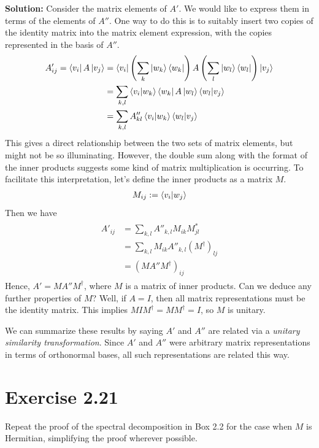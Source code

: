 \documentclass{book}
\begin{document}
    \textbf{Solution:} Consider the matrix elements of $A'$. We would like to express them in terms of the elements of $A''$. One way to do this is to suitably insert two copies of the identity matrix into the matrix element expression, with the copies represented in the basis of $A''$. 
    \begin{align}
    \begin{aligned}
        A'_{ij} = \bra{v_i}A\ket{v_j} &= \bra{v_i}\left(\sum_k \ket{w_k}\bra{w_k}\right) A \left(\sum_l \ket{w_l}\bra{w_l}\right)\ket{v_j} \\
        &= \sum_{k,l} \bra{v_i}\ket{w_k}\bra{w_k}A\ket{w_l}\bra{w_l}\ket{v_j} \\
        &= \sum_{k,l}A''_{kl} \braket{v_i}{w_k}\braket{w_l}{v_j}
    \end{aligned}
    \end{align}
    This gives a direct relationship between the two sets of matrix elements, but might not be so illuminating. However, the double sum along with the format of the inner products suggests some kind of matrix multiplication is occurring. To facilitate this interpretation, let's define the inner products as a matrix $M$.
    \begin{align}
        M_{ij} := \bra{v_i}\ket{w_j}
    \end{align}
    Then we have
    \begin{align}
    \begin{aligned}
        A'_{ij} &= \sum_{k,l} A''_{k,l} M_{ik} M_{jl}^* \\
        &= \sum_{k,l} M_{ik} A''_{k,l} (M^\dagger)_{lj} \\
        &= (M A'' M^\dagger)_{ij}
    \end{aligned}
    \end{align}
    Hence, $A' = M A'' M^\dagger$, where $M$ is a matrix of inner products. Can we deduce any further properties of $M$? Well, if $A= I$, then all matrix representations must be the identity matrix. This implies $M I M^\dagger = M M^\dagger = I$, so $M$ is unitary. 
    
    We can summarize these results by saying $A'$ and $A''$ are related via a \emph{unitary similarity transformation}. Since $A'$ and $A''$ were arbitrary matrix representations in terms of orthonormal bases, all such representations are related this way. 
    
\section*{Exercise 2.21}
    Repeat the proof of the spectral decomposition in Box 2.2 for the case when $M$ is Hermitian, simplifying the proof wherever possible.
    
\end{document}
